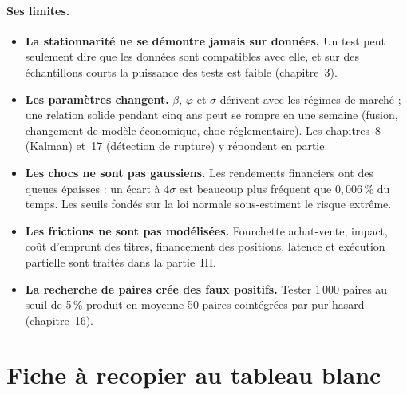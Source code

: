 \paragraph{Ses limites.}
\begin{itemize}
\item \textbf{La stationnarité ne se démontre jamais sur données.} Un test peut seulement dire que les données sont compatibles avec elle, et sur des échantillons courts la puissance des tests est faible (chapitre~3).
\item \textbf{Les paramètres changent.} $\beta$, $\varphi$ et $\sigma$ dérivent avec les régimes de marché ; une relation solide pendant cinq ans peut se rompre en une semaine (fusion, changement de modèle économique, choc réglementaire). Les chapitres~8 (Kalman) et~17 (détection de rupture) y répondent en partie.
\item \textbf{Les chocs ne sont pas gaussiens.} Les rendements financiers ont des queues épaisses : un écart à $4\sigma$ est beaucoup plus fréquent que $0{,}006\,\%$ du temps. Les seuils fondés sur la loi normale sous-estiment le risque extrême.
\item \textbf{Les frictions ne sont pas modélisées.} Fourchette achat-vente, impact, coût d'emprunt des titres, financement des positions, latence et exécution partielle sont traités dans la partie~III.
\item \textbf{La recherche de paires crée des faux positifs.} Tester 1\,000 paires au seuil de 5\,\% produit en moyenne 50 \og paires cointégrées\fg{} par pur hasard (chapitre~16).
\end{itemize}

\section{Fiche à recopier au tableau blanc}

